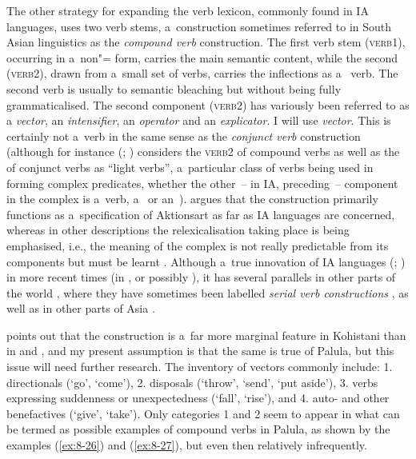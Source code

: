 The other strategy for expanding the verb lexicon, commonly found in IA languages, uses two verb stems, a~construction sometimes referred to in South Asian linguistics \citep[326]{masica1991} as the \textit{compound verb} construction. The first verb stem (\textsc{verb1}), occurring in a~non"= form, carries the main semantic content, while the second (\textsc{verb2}), drawn from a~small set of verbs, carries the inflections as a~ verb. The second verb is usually  to semantic bleaching but without being fully grammaticalised. The second component (\textsc{verb2}) has variously been referred to as a \textit{vector}, an \textit{intensifier}, an \textit{operator} and an \textit{explicator}. I will use \textit{vector}. This is certainly not a~verb  in the same sense as the \textit{conjunct verb} construction (although for instance \citeauthor{butt1993} (\citeyear[31]{butt1993}; \citeyear[49]{butt2010}) considers the \textsc{verb2} of compound verbs as well as the  of conjunct verbs as ``light verbs'', a~particular class of verbs being used in forming complex predicates, whether the other~-- in IA, preceding~-- component in the complex is a~verb, a~ or an~). \citet[326--330]{masica1991} argues that the construction primarily functions as a~specification of Aktionsart as far as IA languages are concerned, whereas in other descriptions the relexicalisation taking place is being emphasised, i.e., the meaning of the complex is not really predictable from its components but must be learnt \citep[143]{schmidt1999}. Although a~true innovation of IA languages (\citealt[326]{masica1991}; \citealt{hook1977}) in more recent times (in \iliNIA, or possibly \iliMIA), it has several parallels in other parts of the world \citep[348--349]{hook1977}, where they have sometimes been labelled \textit{serial verb constructions} \citep{ansaldo2006}, as well as in other parts of Asia \citep[559]{ebert2006}. 



\citet[20]{schmidt2004b} points out that the  construction is a~far more marginal feature in Kohistani \iliShina than in \iliUrduHindi and \iliPunjabi, and my present assumption is that the same is true of Palula, but this issue will need further research. The inventory of vectors commonly include: 1. directionals (`go', `come'), 2. disposals (`throw', `send', `put aside'), 3. verbs expressing suddenness or unexpectedness (`fall', `rise'), and 4. auto- and other benefactives (`give', `take'). Only categories 1 and 2 seem to appear in what can be termed as possible examples of compound verbs in Palula, as shown by the examples (\ref{ex:8-26}) and (\ref{ex:8-27}), but even then relatively infrequently. 

